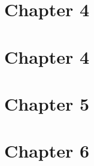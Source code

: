 \documentclass{wileySix}
\begin{document}
\chapter{Chapter 4}
%
%
%
%
%
%
%
%
%
%
%
%
%
%
%
%
%

\chapter{Chapter 4}
%
%
%
%
%
%
%
%
%
%
%
%
%
%
%
%


\chapter{Chapter 5}
%
%
%
%
%
%
%
%
%
%

\chapter{Chapter 6}
%
%
%
%
%
%
%
%
%
\end{document}
